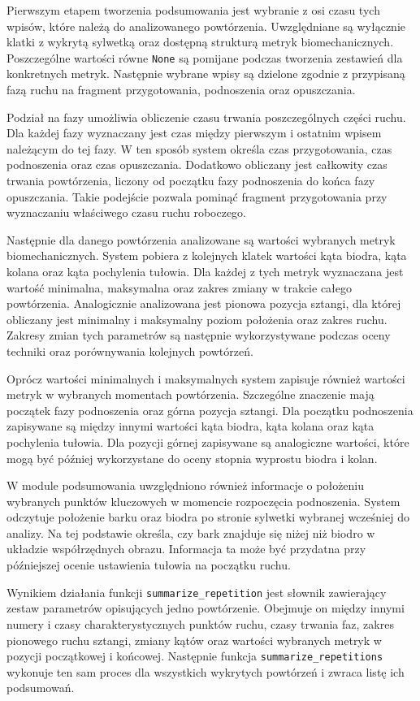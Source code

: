 Pierwszym etapem tworzenia podsumowania jest wybranie z osi czasu tych wpisów, które należą do analizowanego powtórzenia. Uwzględniane są wyłącznie klatki z wykrytą sylwetką oraz dostępną strukturą metryk biomechanicznych. Poszczególne wartości równe \texttt{None} są pomijane podczas tworzenia zestawień dla konkretnych metryk. Następnie wybrane wpisy są dzielone zgodnie z przypisaną fazą ruchu na fragment przygotowania, podnoszenia oraz opuszczania.

Podział na fazy umożliwia obliczenie czasu trwania poszczególnych części ruchu. Dla każdej fazy wyznaczany jest czas między pierwszym i ostatnim wpisem należącym do tej fazy. W ten sposób system określa czas przygotowania, czas podnoszenia oraz czas opuszczania. Dodatkowo obliczany jest całkowity czas trwania powtórzenia, liczony od początku fazy podnoszenia do końca fazy opuszczania. Takie podejście pozwala pominąć fragment przygotowania przy wyznaczaniu właściwego czasu ruchu roboczego.

Następnie dla danego powtórzenia analizowane są wartości wybranych metryk biomechanicznych. System pobiera z kolejnych klatek wartości kąta biodra, kąta kolana oraz kąta pochylenia tułowia. Dla każdej z tych metryk wyznaczana jest wartość minimalna, maksymalna oraz zakres zmiany w trakcie całego powtórzenia. Analogicznie analizowana jest pionowa pozycja sztangi, dla której obliczany jest minimalny i maksymalny poziom położenia oraz zakres ruchu. Zakresy zmian tych parametrów są następnie wykorzystywane podczas oceny techniki oraz porównywania kolejnych powtórzeń.

Oprócz wartości minimalnych i maksymalnych system zapisuje również wartości metryk w wybranych momentach powtórzenia. Szczególne znaczenie mają początek fazy podnoszenia oraz górna pozycja sztangi. Dla początku podnoszenia zapisywane są między innymi wartości kąta biodra, kąta kolana oraz kąta pochylenia tułowia. Dla pozycji górnej zapisywane są analogiczne wartości, które mogą być później wykorzystane do oceny stopnia wyprostu biodra i kolan.

W module podsumowania uwzględniono również informacje o położeniu wybranych punktów kluczowych w momencie rozpoczęcia podnoszenia. System odczytuje położenie barku oraz biodra po stronie sylwetki wybranej wcześniej do analizy. Na tej podstawie określa, czy bark znajduje się niżej niż biodro w układzie współrzędnych obrazu. Informacja ta może być przydatna przy późniejszej ocenie ustawienia tułowia na początku ruchu.

Wynikiem działania funkcji \texttt{summarize\_repetition} jest słownik zawierający zestaw parametrów opisujących jedno powtórzenie. Obejmuje on między innymi numery i czasy charakterystycznych punktów ruchu, czasy trwania faz, zakres pionowego ruchu sztangi, zmiany kątów oraz wartości wybranych metryk w pozycji początkowej i końcowej. Następnie funkcja \texttt{summarize\_repetitions} wykonuje ten sam proces dla wszystkich wykrytych powtórzeń i zwraca listę ich podsumowań.

